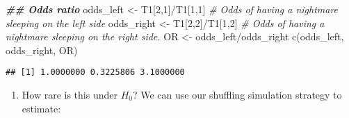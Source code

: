 \documentclass[
]{article}
\newenvironment{Shaded}{\begin{snugshade}}{\end{snugshade}}
\newcommand{\CommentTok}[1]{\textcolor[rgb]{0.56,0.35,0.01}{\textit{#1}}}
\newcommand{\DecValTok}[1]{\textcolor[rgb]{0.00,0.00,0.81}{#1}}
\newcommand{\DocumentationTok}[1]{\textcolor[rgb]{0.56,0.35,0.01}{\textbf{\textit{#1}}}}
\newcommand{\FunctionTok}[1]{\textcolor[rgb]{0.00,0.00,0.00}{#1}}
\newcommand{\NormalTok}[1]{#1}
\newcommand{\OtherTok}[1]{\textcolor[rgb]{0.56,0.35,0.01}{#1}}
\newcommand{\SpecialCharTok}[1]{\textcolor[rgb]{0.00,0.00,0.00}{#1}}
\providecommand{\tightlist}{%
  \setlength{\itemsep}{0pt}\setlength{\parskip}{0pt}}
\begin{document}
\begin{Shaded}
\begin{Highlighting}[]
\DocumentationTok{\#\# Odds ratio}
\NormalTok{odds\_left }\OtherTok{\textless{}{-}}\NormalTok{ T1[}\DecValTok{2}\NormalTok{,}\DecValTok{1}\NormalTok{]}\SpecialCharTok{/}\NormalTok{T1[}\DecValTok{1}\NormalTok{,}\DecValTok{1}\NormalTok{]       }\CommentTok{\# Odds of having a nightmare sleeping on the left side  }
\NormalTok{odds\_right }\OtherTok{\textless{}{-}}\NormalTok{ T1[}\DecValTok{2}\NormalTok{,}\DecValTok{2}\NormalTok{]}\SpecialCharTok{/}\NormalTok{T1[}\DecValTok{1}\NormalTok{,}\DecValTok{2}\NormalTok{]       }\CommentTok{\# Odds of having a nightmare sleeping on the right side.}
\NormalTok{OR }\OtherTok{\textless{}{-}}\NormalTok{ odds\_left}\SpecialCharTok{/}\NormalTok{odds\_right}
\FunctionTok{c}\NormalTok{(odds\_left, odds\_right, OR)}
\end{Highlighting}
\end{Shaded}

\begin{verbatim}
## [1] 1.0000000 0.3225806 3.1000000
\end{verbatim}

\vspace{0.25in}

\begin{enumerate}
\def\labelenumi{(\arabic{enumi})}
\setcounter{enumi}{17}
\tightlist
\item
  How rare is this under \(H_0\)? We can use our shuffling simulation
  strategy to estimate:
\end{enumerate}
\end{document}
